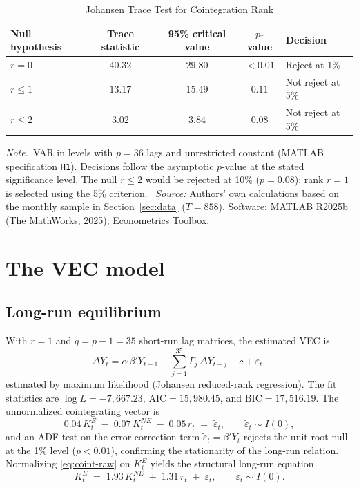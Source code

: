 \documentclass[12pt]{article}
\numberwithin{equation}{section}
\numberwithin{table}{section}
\theoremstyle{definition}
\newcommand{\KE}{K^{E}}
\newcommand{\KNE}{K^{NE}}
\newcommand{\tabnote}{\par\addvspace{0.4em}\noindent\emph{Note.}}
\newcommand{\tabsource}{\ \textit{Source:} Authors' own calculations based on
the monthly sample in Section~\ref{sec:data} ($T=858$). Software: MATLAB
R2025b (The MathWorks, 2025); Econometrics Toolbox.}
\begin{document}
\begin{table}[H]
\centering
\caption{Johansen Trace Test for Cointegration Rank}
\label{tab:johansen}
\begin{tabular}{lcccl}
\toprule
Null hypothesis & Trace statistic & 95\% critical value & $p$-value &
Decision \\
\midrule
$r=0$     & $40.32$ & $29.80$ & $<0.01$ & Reject at 1\% \\
$r\le 1$  & $13.17$ & $15.49$ & $0.11$  & Not reject at 5\% \\
$r\le 2$  & $3.02$  & $3.84$  & $0.08$  & Not reject at 5\% \\
\bottomrule
\end{tabular}
\tabnote\ VAR in levels with $p=36$ lags and unrestricted constant
(MATLAB specification \texttt{H1}). Decisions follow the asymptotic
$p$-value at the stated significance level. The null $r\le 2$ would be
rejected at 10\% ($p=0.08$); rank $r=1$ is selected using the 5\%
criterion.
\tabsource
\end{table}

\section{The VEC model}
\label{sec:vec}

\subsection{Long-run equilibrium}

With $r=1$ and $q=p-1=35$ short-run lag matrices, the estimated VEC is
\begin{equation}
\Delta Y_t = \alpha\,\beta' Y_{t-1}
 + \sum_{j=1}^{35}\Gamma_j\,\Delta Y_{t-j} + c + \varepsilon_t ,
\label{eq:vec-general}
\end{equation}
estimated by maximum likelihood (Johansen reduced-rank regression). The fit
statistics are $\log L = -7{,}667.23$, $\mathrm{AIC} = 15{,}980.45$, and
$\mathrm{BIC} = 17{,}516.19$. The unnormalized cointegrating vector is
\begin{equation}
0.04\,\KE_t \;-\; 0.07\,\KNE_t \;-\; 0.05\,r_t
 \;=\; \tilde\varepsilon_t ,
\qquad \tilde\varepsilon_t \sim I(0),
\label{eq:coint-raw}
\end{equation}
and an ADF test on the error-correction term
$\tilde\varepsilon_t = \beta' Y_t$ rejects the unit-root null at the 1\%
level ($p<0.01$), confirming the stationarity of the long-run relation.
Normalizing \eqref{eq:coint-raw} on $\KE_t$ yields the structural long-run
equation
\begin{equation}
\KE_t \;=\; 1.93\,\KNE_t \;+\; 1.31\,r_t \;+\; \varepsilon_t ,
\qquad \varepsilon_t \sim I(0).
\label{eq:coint-normalized}
\end{equation}
\end{document}
